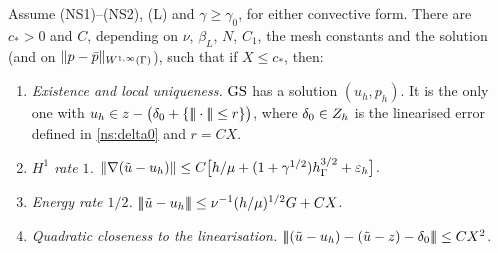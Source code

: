 \begin{theorem}\label{ns:thmGS}
Assume (NS1)--(NS2), (L) and $\gamma\ge\gamma_0$, for either convective form. There are $c_\ast>0$ and $C$, depending on $\nu$, $\beta_L$, $N$, $C_1$, the mesh constants and the solution (and on $\lVert p-\bar p\rVert_{W^{1,\infty}(\Gamma)}$), such that if $X\le c_\ast$, then:
\begin{enumerate}[label=(\alph*)]
\item \emph{Existence and local uniqueness.} $\mathrm{GS}$ has a solution $(u_h,p_h)$. It is the only one with $u_h\in z-\bigl(\delta_0+\{|\!|\!|\cdot|\!|\!|\le r\}\bigr)$, where $\delta_0\in Z_h$ is the linearised error defined in \eqref{ns:delta0} and $r=CX$.
\item \emph{$H^1$ rate $1$.} $\lVert \nabla(\tilde u-u_h)\rVert\le C\bigl[h/\mu+(1+\gamma^{1/2})h_\Gamma^{3/2}+\varepsilon_h\bigr]$.
\item \emph{Energy rate $1/2$.} $|\!|\!|\tilde u-u_h|\!|\!|\le\nu^{-1}(h/\mu)^{1/2}G+CX$.
\item \emph{Quadratic closeness to the linearisation.} $|\!|\!|(\tilde u-u_h)-(\tilde u-z)-\delta_0|\!|\!|\le CX^2$.
\end{enumerate}
\end{theorem}


